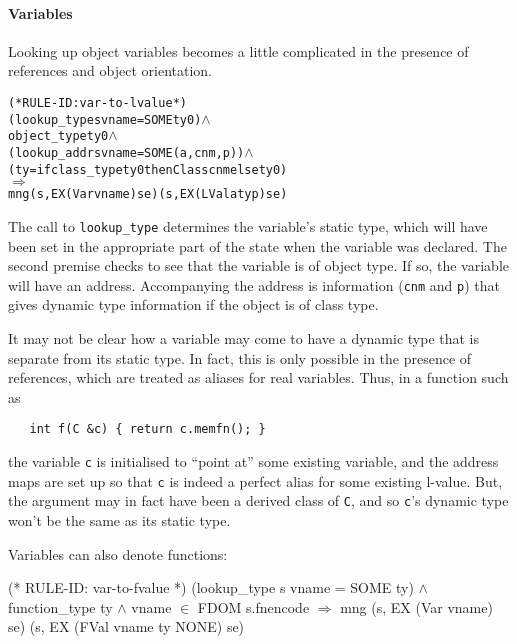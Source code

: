 \documentclass[11pt]{article}
\begin{document}
\paragraph{Variables} Looking up object variables becomes a little
complicated in the presence of references and object orientation.
%
%
\begin{alltt}
(* RULE-ID: var-to-lvalue *)
     (lookup_type s vname = SOME ty0) \(\land\)
     object_type ty0 \(\land\)
     (lookup_addr s vname = SOME (a,cnm,p)) \(\land\)
     (ty = if class_type ty0 then Class cnm else ty0)
   \(\Rightarrow\)
     mng (s, EX (Var vname) se) (s, EX (LVal a ty p) se)
\end{alltt}
%
The call to \texttt{lookup_type} determines the variable's static
type, which will have been set in the appropriate part of the state
when the variable was declared.  The second premise checks to see that
the variable is of object type.  If so, the variable will have an
address.  Accompanying the address is information (\texttt{cnm} and
\texttt{p}) that gives dynamic type information if the object is of
class type.

It may not be clear how a variable may come to have a dynamic type
that is separate from its static type.  In fact, this is only possible
in the presence of references, which are treated as aliases for real
variables.  Thus, in a function such as
\begin{verbatim}
   int f(C &c) { return c.memfn(); }
\end{verbatim}
the variable \texttt{c} is initialised to ``point at'' some existing
variable, and the address maps are set up so that \texttt{c} is indeed
a perfect alias for some existing l-value.  But, the argument may in
fact have been a derived class of \texttt{C}, and so \texttt{c}'s
dynamic type won't be the same as its static type.

Variables can also denote functions:
%
%
\begin{stdrule}
(* RULE-ID: var-to-fvalue *)
     (lookup_type s vname = SOME ty) \(\land\)
     function_type ty \(\land\)
     vname \(\in\) FDOM s.fnencode
   \(\Rightarrow\)
     mng (s, EX (Var vname) se) (s, EX (FVal vname ty NONE) se)
\end{stdrule}
\end{document}

